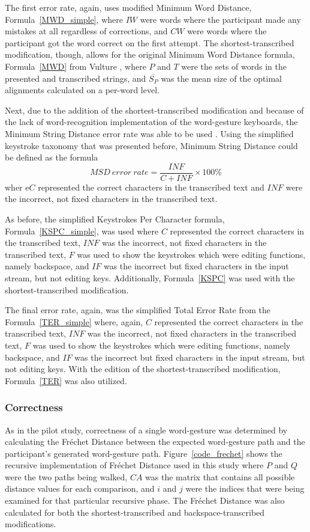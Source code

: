 The first error rate, again, uses modified Minimum Word Distance, Formula~\ref{MWD_simple}, where $IW$ were words where the participant made any mistakes at all regardless of corrections, and $CW$ were words where the participant got the word correct on the first attempt. The shortest-transcribed modification, though, allows for the original Minimum Word Distance formula, Formula~\ref{MWD} from Vulture \cite{ref_vulture}, where $P$ and $T$ were the sets of words in the presented and transcribed strings, and $\overline{S_P}$ was the mean size of the optimal alignments calculated on a per-word level.

Next, due to the addition of the shortest-transcribed modification and because of the lack of word-recognition implementation of the word-gesture keyboards, the Minimum String Distance error rate was able to be used \cite{ref_error_rates}. Using the simplified keystroke taxonomy that was presented before, Minimum String Distance could be defined as the formula
\begin{equation} \label{pilot_ter}
	MSD\ error\ rate = \frac{INF}{C + INF} \times 100\%
\end{equation}
wher e$C$ represented the correct characters in the transcribed text and $INF$ were the incorrect, not fixed characters in the transcribed text.

As before, the simplified Keystrokes Per Character formula, Formula~\ref{KSPC_simple}, was used where $C$ represented the correct characters in the transcribed text, $INF$ was the incorrect, not fixed characters in the transcribed text, $F$ was used to show the keystrokes which were editing functions, namely backspace, and $IF$ was the incorrect but fixed characters in the input stream, but not editing keys. Additionally, Formula~\ref{KSPC} was used with the shortest-transcribed modification.

The final error rate, again, was the simplified Total Error Rate from the Formula~\ref{TER_simple} where, again, $C$ represented the correct characters in the transcribed text, $INF$ was the incorrect, not fixed characters in the transcribed text, $F$ was used to show the keystrokes which were editing functions, namely backspace, and $IF$ was the incorrect but fixed characters in the input stream, but not editing keys. With the edition of the shortest-transcribed modification, Formula~\ref{TER} was also utilized.

\subsubsection{Correctness}
As in the pilot study, correctness of a single word-gesture was determined by calculating the Fr\'echet Distance between the expected word-gesture path and the participant's generated word-gesture path. Figure~\ref{code_frechet} shows the recursive implementation of Fr\'echet Distance used in this study where $P$ and $Q$ were the two paths being walked, $CA$ was the matrix that contains all possible distance values for each comparison, and $i$ and $j$ were the indices that were being examined for that particular recursive phase. The Fr\'echet Distance was also calculated for both the shortest-transcribed and backspace-transcribed modifications.

